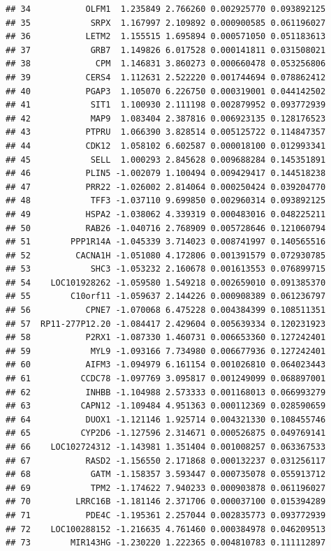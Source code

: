 \documentclass[
]{article}
\begin{document}
\begin{verbatim}
## 34           OLFM1  1.235849 2.766260 0.002925770 0.093892125
## 35            SRPX  1.167997 2.109892 0.000900585 0.061196027
## 36           LETM2  1.155515 1.695894 0.000571050 0.051183613
## 37            GRB7  1.149826 6.017528 0.000141811 0.031508021
## 38             CPM  1.146831 3.860273 0.000660478 0.053256806
## 39           CERS4  1.112631 2.522220 0.001744694 0.078862412
## 40           PGAP3  1.105070 6.226750 0.000319001 0.044142502
## 41            SIT1  1.100930 2.111198 0.002879952 0.093772939
## 42            MAP9  1.083404 2.387816 0.006923135 0.128176523
## 43           PTPRU  1.066390 3.828514 0.005125722 0.114847357
## 44           CDK12  1.058102 6.602587 0.000018100 0.012993341
## 45            SELL  1.000293 2.845628 0.009688284 0.145351891
## 46           PLIN5 -1.002079 1.100494 0.009429417 0.144518238
## 47           PRR22 -1.026002 2.814064 0.000250424 0.039204770
## 48            TFF3 -1.037110 9.699850 0.002960314 0.093892125
## 49           HSPA2 -1.038062 4.339319 0.000483016 0.048225211
## 50           RAB26 -1.040716 2.768909 0.005728646 0.121060794
## 51        PPP1R14A -1.045339 3.714023 0.008741997 0.140565516
## 52         CACNA1H -1.051080 4.172806 0.001391579 0.072930785
## 53            SHC3 -1.053232 2.160678 0.001613553 0.076899715
## 54    LOC101928262 -1.059580 1.549218 0.002659010 0.091385370
## 55        C10orf11 -1.059637 2.144226 0.000908389 0.061236797
## 56           CPNE7 -1.070068 6.475228 0.004384399 0.108511351
## 57  RP11-277P12.20 -1.084417 2.429604 0.005639334 0.120231923
## 58           P2RX1 -1.087330 1.460731 0.006653360 0.127242401
## 59            MYL9 -1.093166 7.734980 0.006677936 0.127242401
## 60           AIFM3 -1.094979 6.161154 0.001026810 0.064023443
## 61          CCDC78 -1.097769 3.095817 0.001249099 0.068897001
## 62           INHBB -1.104988 2.573333 0.001168013 0.066993279
## 63          CAPN12 -1.109484 4.951363 0.000112369 0.028590659
## 64           DUOX1 -1.121146 1.925714 0.004321330 0.108455746
## 65          CYP2D6 -1.127596 2.314671 0.000526875 0.049769141
## 66    LOC102724312 -1.143981 1.351404 0.001008257 0.063367533
## 67           RASD2 -1.156550 2.171868 0.000132237 0.031256117
## 68            GATM -1.158357 3.593447 0.000735078 0.055913712
## 69            TPM2 -1.174622 7.940233 0.000903878 0.061196027
## 70         LRRC16B -1.181146 2.371706 0.000037100 0.015394289
## 71           PDE4C -1.195361 2.257044 0.002835773 0.093772939
## 72    LOC100288152 -1.216635 4.761460 0.000384978 0.046209513
## 73        MIR143HG -1.230220 1.222365 0.004810783 0.111112897

\end{verbatim}
\end{document}
